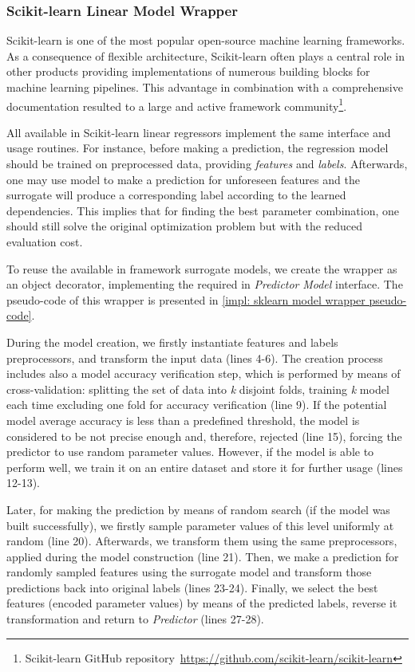 \subsubsection{Scikit-learn Linear Model Wrapper}\label{impl: sklearn wrapper}
Scikit-learn is one of the most popular open-source machine learning frameworks. As a consequence of flexible architecture, Scikit-learn often plays a central role in other products providing implementations of numerous building blocks for machine learning pipelines. This advantage in combination with a comprehensive documentation resulted to a large and active framework community\footnote{Scikit-learn GitHub repository~\url{https://github.com/scikit-learn/scikit-learn}}.

All available in Scikit-learn linear regressors implement the same interface and usage routines. For instance, before making a prediction, the regression model should be trained on preprocessed data, providing \emph{features} and \emph{labels}. Afterwards, one may use model to make a prediction for unforeseen features and the surrogate will produce a corresponding label according to the learned dependencies. This implies that for finding the best parameter combination, one should still solve the original optimization problem but with the reduced evaluation cost.

To reuse the available in framework surrogate models, we create the wrapper as an object decorator, implementing the required in \emph{Predictor} \emph{Model} interface. The pseudo-code of this wrapper is presented in \cref{impl: sklearn model wrapper pseudo-code}.

During the model creation, we firstly instantiate features and labels preprocessors, and transform the input data (lines 4-6). The creation process includes also a model accuracy verification step, which is performed by means of cross-validation: splitting the set of data into \textit{k} disjoint folds, training \textit{k} model each time excluding one fold for accuracy verification (line 9). If the potential model average accuracy is less than a predefined threshold, the model is considered to be not precise enough and, therefore, rejected (line 15), forcing the predictor to use random parameter values. However, if the model is able to perform well, we train it on an entire dataset and store it for further usage (lines 12-13).

Later, for making the prediction by means of random search (if the model was built successfully), we firstly sample parameter values of this level uniformly at random (line 20). Afterwards, we transform them using the same preprocessors, applied during the model construction (line 21). Then, we make a prediction for randomly sampled features using the surrogate model and transform those predictions back into original labels (lines 23-24). Finally, we select the best features (encoded parameter values) by means of the predicted labels, reverse it transformation and return to \emph{Predictor} (lines 27-28).

